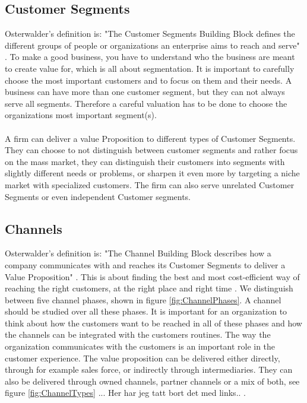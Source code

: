 \subsection{Customer Segments}
Osterwalder's definition is: "The Customer Segments Building Block defines the different groups of people or organizations an enterprise aims to reach and serve" \cite{osterwalder}. To make a good business, you have to understand who the business are meant to create value for, which is all about segmentation. It is important to carefully choose the most important customers and to focus on them and their needs. A business can have more than one customer segment, but they can not always serve all segments. Therefore a careful valuation has to be done to choose the organizations most important segment(s). \cite{osterwalder} \cite{osterwalderthesis} \\ \\
A firm can deliver a value Proposition to different types of Customer Segments. They can choose to not distinguish between customer segments and rather focus on the mass market, they can distinguish their customers into segments with slightly different needs or problems, or sharpen it even more by targeting a niche market with specialized customers. The firm can also serve unrelated Customer Segments or even independent Customer segments. \cite{osterwalder}

\subsection{Channels}
Osterwalder's definition is: "The Channel Building Block describes how a company communicates with and reaches its Customer Segments to deliver a Value Proposition" \cite{osterwalder}. This is about finding the best and most cost-efficient way of reaching the right customers, at the right place and right time \cite{osterwalderthesis}. We distinguish between five channel phases, shown in figure \ref{fig:ChannelPhases}. A channel should be studied over all these phases. It is important for an organization to think about how the customers want to be reached in all of these phases and how the channels can be integrated with the customers routines. The way the organization communicates with the customers is an important role in the customer experience. The value proposition can be delivered either directly, through for example sales force, or indirectly through intermediaries. They can also be delivered through owned channels, partner channels or a mix of both, see figure  \ref{fig:ChannelTypes} ...  Her har jeg tatt bort det med links.. 
 \cite{osterwalderthesis}. \\ \\

